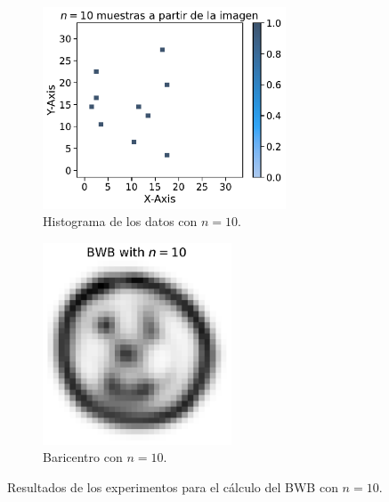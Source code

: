 \begin{figure}[H]
    \begin{subfigure}[t]{0.49\textwidth}
        \centering
        \includegraphics[height=6cm]{img/bwb/samples-hist-n-10.pdf}
        \caption{Histograma de los datos con $n=10$.}
        \label{fig:samples-hist-n-10}
    \end{subfigure}
    \hfill
    \begin{subfigure}[t]{0.49\textwidth}
        \centering
        \includegraphics[height=6cm]{img/bwb/BWB-n-data-10.pdf}
        \caption{Baricentro con $n=10$.}
        \label{fig:bwb-n-data-10}
    \end{subfigure}
    \caption{Resultados de los experimentos para el cálculo del BWB con $n=10$.}
    \label{fig:bwb-experiments-n-10}
\end{figure}

